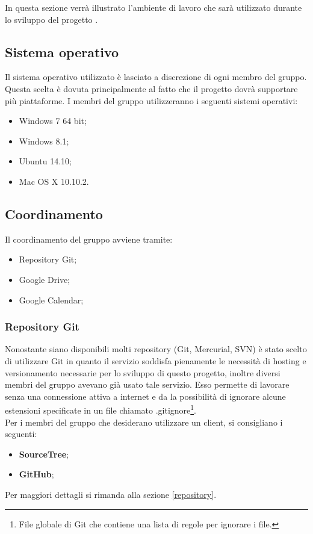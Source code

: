 In questa sezione verrà illustrato l'ambiente di lavoro che sarà utilizzato durante lo sviluppo del progetto \PROGETTO.\\

\subsection{Sistema operativo}

Il sistema operativo utilizzato è lasciato a discrezione di ogni membro del gruppo. Questa scelta è dovuta principalmente al fatto che il progetto dovrà supportare più piattaforme.
I membri del gruppo utilizzeranno i seguenti sistemi operativi:

\begin{itemize}
	\item Windows 7 64 bit;
	\item Windows 8.1;
	\item Ubuntu 14.10;
	\item Mac OS X 10.10.2.
\end{itemize}

\subsection{Coordinamento}

Il coordinamento del gruppo avviene tramite:
\begin{itemize}
	\item Repository Git;
	\item Google Drive;
	\item Google Calendar;
\end{itemize}

\subsubsection{Repository Git}

Nonostante siano disponibili molti repository (Git, Mercurial, SVN) è stato scelto di utilizzare Git in quanto il servizio soddisfa pienamente le necessità di hosting e versionamento necessarie per lo sviluppo di questo progetto, inoltre diversi membri del gruppo avevano già usato tale servizio. Esso permette di lavorare senza una connessione attiva a internet e da la possibilità di ignorare alcune estensioni specificate in un file chiamato .gitignore\footnote{File globale di Git che contiene una lista di regole per ignorare i file.}.\\ Per i membri del gruppo che desiderano utilizzare un client, si consigliano i seguenti:
\begin{itemize}
	\item \textbf{SourceTree};
	\item \textbf{GitHub};
\end{itemize}
Per maggiori dettagli si rimanda alla sezione \ref{repository}.

